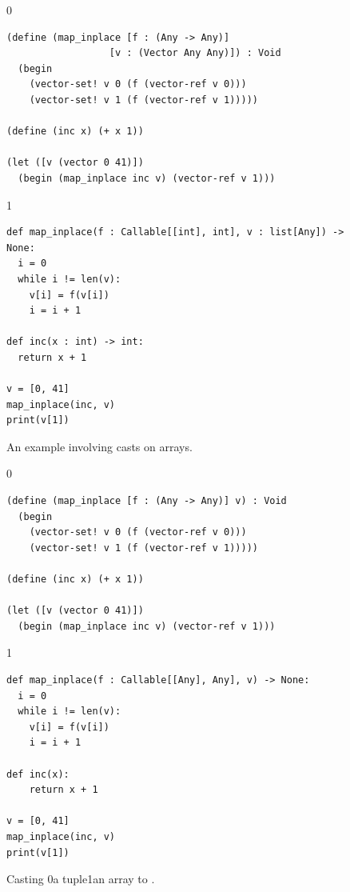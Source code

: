 \documentclass[7x10]{TimesAPriori_MIT}%
\def\racketEd{0}
\def\pythonEd{1}
\def\edition{1}
\newcommand{\racket}[1]{{\if\edition\racketEd{#1}\fi}}
\newcommand{\pythonColor}[0]{}
\newcommand{\python}[1]{{\if\edition\pythonEd\pythonColor #1\fi}}
\numberwithin{theorem}{chapter}
\numberwithin{definition}{chapter}
\numberwithin{equation}{chapter}
\begin{document}
\begin{figure}[tbp]
  \begin{tcolorbox}[colback=white]
{\if\edition\racketEd
\begin{lstlisting}
(define (map_inplace [f : (Any -> Any)]
                  [v : (Vector Any Any)]) : Void
  (begin
    (vector-set! v 0 (f (vector-ref v 0)))
    (vector-set! v 1 (f (vector-ref v 1)))))

(define (inc x) (+ x 1))

(let ([v (vector 0 41)])
  (begin (map_inplace inc v) (vector-ref v 1)))
\end{lstlisting}
\fi}
{\if\edition\pythonEd\pythonColor
\begin{lstlisting}
def map_inplace(f : Callable[[int], int], v : list[Any]) -> None:
  i = 0
  while i != len(v):
    v[i] = f(v[i])
    i = i + 1

def inc(x : int) -> int:
  return x + 1

v = [0, 41]
map_inplace(inc, v)
print(v[1])
\end{lstlisting}
\fi}
  \end{tcolorbox}

  \caption{An example involving casts on arrays.}
\label{fig:map-bang}
\end{figure}

\begin{figure}[btp]
  \begin{tcolorbox}[colback=white]
{\if\edition\racketEd
\begin{lstlisting}
(define (map_inplace [f : (Any -> Any)] v) : Void
  (begin
    (vector-set! v 0 (f (vector-ref v 0)))
    (vector-set! v 1 (f (vector-ref v 1)))))

(define (inc x) (+ x 1))

(let ([v (vector 0 41)])
  (begin (map_inplace inc v) (vector-ref v 1)))
\end{lstlisting}
\fi}
{\if\edition\pythonEd\pythonColor
\begin{lstlisting}
def map_inplace(f : Callable[[Any], Any], v) -> None:
  i = 0
  while i != len(v):
    v[i] = f(v[i])
    i = i + 1

def inc(x):
    return x + 1

v = [0, 41]
map_inplace(inc, v)
print(v[1])
\end{lstlisting}
\fi}
  \end{tcolorbox}

  \caption{Casting \racket{a tuple}\python{an array} to \CANYTY{}.}
\label{fig:map-any}
\end{figure}
\end{document}
